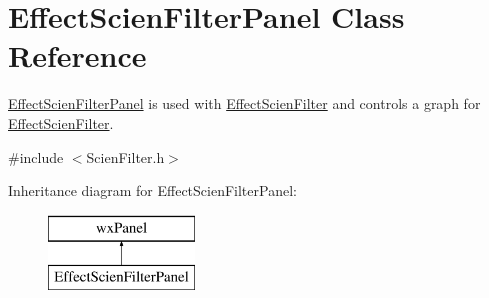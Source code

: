 \hypertarget{class_effect_scien_filter_panel}{}\section{Effect\+Scien\+Filter\+Panel Class Reference}
\label{class_effect_scien_filter_panel}


\hyperlink{class_effect_scien_filter_panel}{Effect\+Scien\+Filter\+Panel} is used with \hyperlink{class_effect_scien_filter}{Effect\+Scien\+Filter} and controls a graph for \hyperlink{class_effect_scien_filter}{Effect\+Scien\+Filter}.  




{\ttfamily \#include $<$Scien\+Filter.\+h$>$}

Inheritance diagram for Effect\+Scien\+Filter\+Panel\+:\begin{figure}[H]
\begin{center}
\leavevmode
\includegraphics[height=2.000000cm]{class_effect_scien_filter_panel}
\end{center}
\end{figure}
